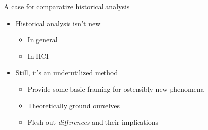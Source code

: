 \documentclass[presentation]{subfiles}
\begin{document}
\begin{frame}{A case for comparative historical analysis}
\begin{itemize}
  \item Historical analysis isn't new
  \begin{itemize}
    \item In general\\
    \scriptsize{
      \textcite{rosenberg1994exploring,rosenberg1982inside}
    }
    \item In HCI\\
    \scriptsize{
      \textcite{Wyche2006,bodker1993historical}
    }
  \end{itemize}
  \item Still, it's an underutilized method
  \begin{itemize}
    \item Provide some basic framing for ostensibly new phenomena
    \item Theoretically ground ourselves
    \item Flesh out \emph{differences} and their implications
  \end{itemize}
\end{itemize}
\end{frame}



\onlyinsubfile{
  \printbibliography{}
}
\end{document}
